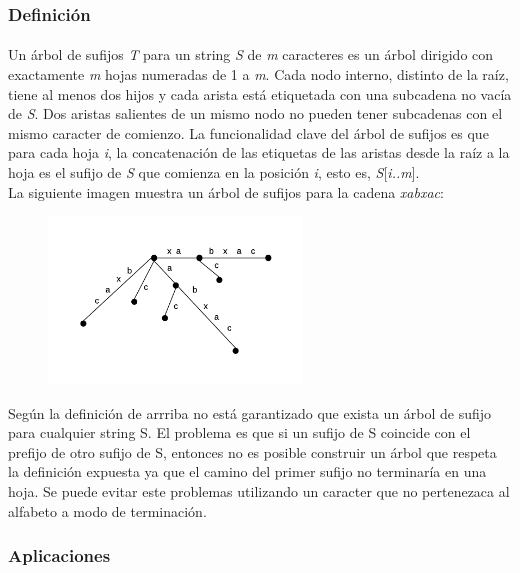 \documentclass[es]{ifirak}
\begin{document}
\subsubsection{Definición}
\paragraph{}
	Un árbol de sufijos \textit{T} para un string \textit{S} de \textit{m} caracteres es un árbol dirigido con exactamente \textit{m} hojas numeradas de 1 a \textit{m}. Cada nodo interno, distinto de la raíz, tiene al menos dos hijos y cada arista está etiquetada con una subcadena no vacía de \textit{S}. Dos aristas salientes de un mismo nodo no pueden tener subcadenas con el mismo caracter de comienzo. La funcionalidad clave del árbol de sufijos es que para cada hoja \textit{i}, la concatenación de las etiquetas de las aristas desde la raíz a la hoja es el sufijo de \textit{S} que comienza en la posición \textit{i}, esto es, \textit{S}[\textit{i..m}].\\
	
	La siguiente imagen muestra un árbol de sufijos para la cadena \textit{xabxac}:
	\begin{figure}[hbtp]
		\centering
		\includegraphics[width=0.6\textwidth]{SuffixTree1.png}
	\end{figure}
	
	Según la definición de arrriba no está garantizado que exista un árbol de sufijo para cualquier string S. El problema es que si un sufijo de S coincide con el prefijo de otro sufijo de S, entonces no es posible construir un árbol que respeta la definición expuesta ya que el camino del primer sufijo no terminaría en una hoja. Se puede evitar este problemas utilizando un caracter que no pertenezaca al alfabeto a modo de terminación.
	
\subsubsection{Aplicaciones}
\end{document}
